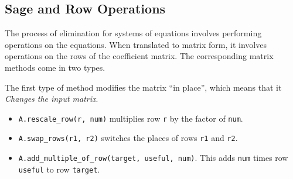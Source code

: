 \documentclass[10pt,]{book}
\theoremstyle{plain}
\numberwithin{equation}{section}
\begin{document}
\subsection[Sage and Row Operations]{Sage and Row Operations}\label{subsection-27}

        The process of elimination for systems of equations involves performing
        operations on the equations. When translated to matrix form, it involves
        operations on the rows of the coefficient matrix. The corresponding
        matrix methods come in two types.
\par

        The first type of method modifies the matrix ``in place'', which means
        that it \emph{Changes the input matrix}.
\begin{itemize}
\item{}\verb?A.rescale_row(r, num)? multiplies row \verb?r? by the factor of \verb?num?.\item{}\verb?A.swap_rows(r1, r2)? switches the places of rows \verb?r1? and \verb?r2?.\item{}\verb?A.add_multiple_of_row(target, useful, num)?. This adds \verb?num?
          times row \verb?useful? to row \verb?target?.\end{itemize}
\par
\end{document}
